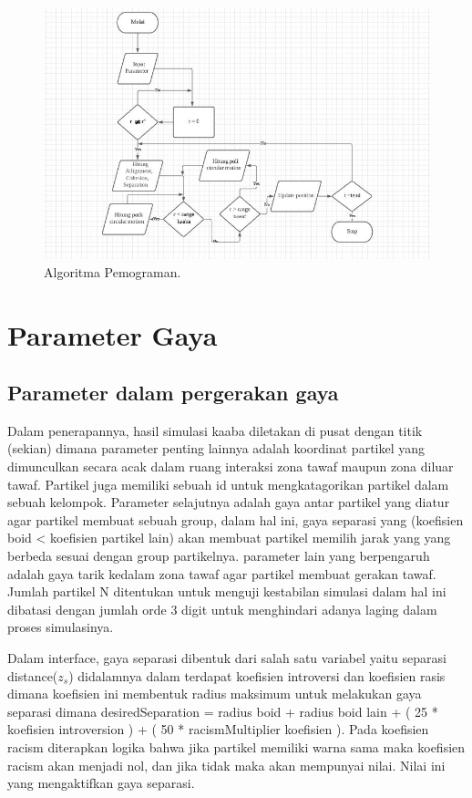 \begin{figure}
\centering
\includegraphics[scale=0.5]{gambar/diagram} %
\caption{Algoritma Pemograman.}
\end{figure}

\section{Parameter Gaya}
\subsection{Parameter dalam pergerakan gaya}
\hspace{0.6cm}Dalam penerapannya, hasil simulasi kaaba diletakan di pusat dengan titik (sekian) dimana parameter penting lainnya adalah koordinat partikel yang dimunculkan secara acak dalam ruang interaksi zona tawaf maupun zona diluar tawaf. Partikel juga memiliki sebuah id untuk mengkatagorikan partikel dalam sebuah kelompok. Parameter selajutnya adalah gaya antar partikel yang diatur agar partikel membuat sebuah group, dalam hal ini, gaya separasi yang (koefisien boid < koefisien partikel lain) akan membuat partikel memilih jarak yang yang berbeda sesuai dengan group partikelnya. parameter lain yang berpengaruh adalah gaya tarik kedalam zona tawaf agar partikel membuat gerakan tawaf. Jumlah partikel N ditentukan untuk menguji kestabilan simulasi dalam hal ini dibatasi dengan jumlah orde 3 digit untuk menghindari adanya laging dalam proses simulasinya.

Dalam interface, gaya separasi dibentuk dari salah satu variabel yaitu separasi distance($z_s$) didalamnya dalam  terdapat koefisien introversi dan koefisien rasis dimana koefisien ini membentuk radius maksimum untuk melakukan gaya separasi dimana desiredSeparation = radius boid + radius boid lain + ( 25 * koefisien introversion ) + ( 50 * racismMultiplier koefisien ). Pada koefisien racism diterapkan logika bahwa jika partikel memiliki warna sama maka koefisien racism akan menjadi nol, dan jika tidak maka akan mempunyai nilai. Nilai ini yang mengaktifkan gaya separasi.

